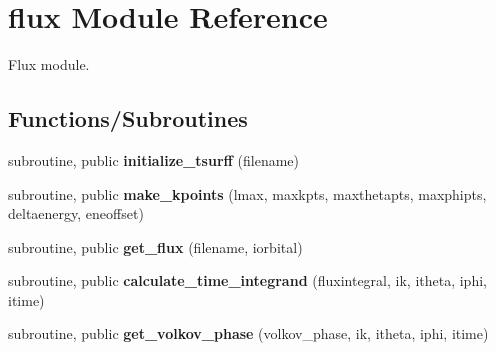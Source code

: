 \hypertarget{namespaceflux}{}\section{flux Module Reference}
\label{namespaceflux}


Flux module.  


\subsection*{Functions/\+Subroutines}
\begin{DoxyCompactItemize}
\item 
\mbox{\label{namespaceflux_afbe72e1cf19f311bac15e6e015f998a0}} 
subroutine, public {\bfseries initialize\+\_\+tsurff} (filename)
\item 
\mbox{\label{namespaceflux_aaa28bbe52ee6b3671c068f6c3190d908}} 
subroutine, public {\bfseries make\+\_\+kpoints} (lmax, maxkpts, maxthetapts, maxphipts, deltaenergy, eneoffset)
\item 
\mbox{\label{namespaceflux_a708e0f0ebd170bdc9da7fb40196bee3f}} 
subroutine, public {\bfseries get\+\_\+flux} (filename, iorbital)
\item 
\mbox{\label{namespaceflux_afbcdcaf92171a5e303b254bf533ba4a3}} 
subroutine, public {\bfseries calculate\+\_\+time\+\_\+integrand} (fluxintegral, ik, itheta, iphi, itime)
\item 
\mbox{\label{namespaceflux_a6d69c7ea5f5cffd9aba456aebda7bfa6}} 
subroutine, public {\bfseries get\+\_\+volkov\+\_\+phase} (volkov\+\_\+phase, ik, itheta, iphi, itime)
\end{DoxyCompactItemize}
